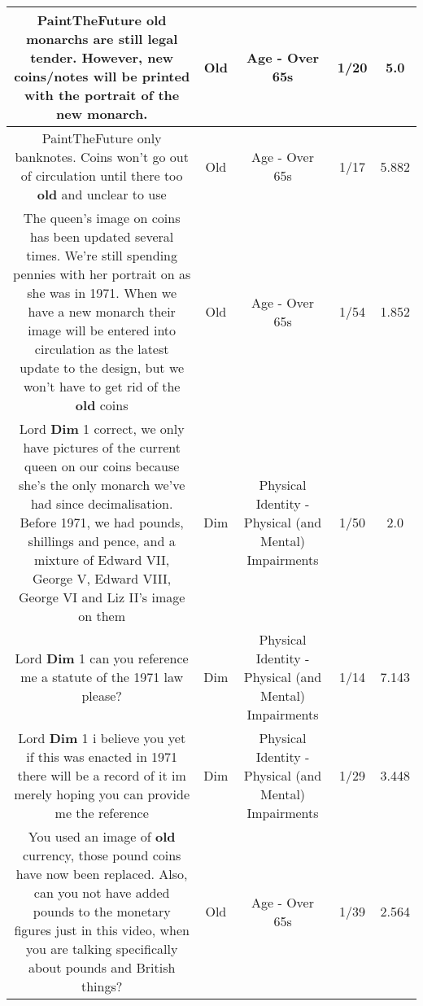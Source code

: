 \documentclass[11pt]{article}
\newlength\mylength
\begin{document}
\begin{center}
\begin{longtable}{|C{.65\mylength}|C{.30\mylength}|C{.12\mylength}|C{.12\mylength}|C{.12\mylength}|}
  \small PaintTheFuture \textbf{old} monarchs are still legal tender. However, new coins/notes will be printed with the portrait of the new monarch.\normalsize   & Old & Age - Over 65s & 1/20 & 5.0 \\  \hline
  \small PaintTheFuture only banknotes. Coins won't go out of circulation until there too \textbf{old} and unclear to use\normalsize   & Old & Age - Over 65s & 1/17 & 5.882 \\  \hline
  \small The queen's image on coins has been updated several times. We're still spending pennies with her portrait on as she was in 1971. When we have a new monarch their image will be entered into circulation as the latest update to the design, but we won't have to get rid of the \textbf{old} coins\normalsize   & Old & Age - Over 65s & 1/54 & 1.852 \\  \hline
  \small Lord \textbf{Dim} 1 correct, we only have pictures of the current queen on our coins because she's the only monarch we've had since decimalisation. Before 1971, we had pounds, shillings and pence, and a mixture of Edward VII, George V, Edward VIII, George VI and Liz II's image on them\normalsize   & Dim & Physical Identity - Physical (and Mental) Impairments & 1/50 & 2.0 \\  \hline
  \small Lord \textbf{Dim} 1 can you reference me a statute of the 1971 law please?\normalsize   & Dim & Physical Identity - Physical (and Mental) Impairments & 1/14 & 7.143 \\  \hline
  \small Lord \textbf{Dim} 1 i believe you yet if this was enacted in 1971 there will be a record of it im merely hoping you can provide me the reference\normalsize   & Dim & Physical Identity - Physical (and Mental) Impairments & 1/29 & 3.448 \\  \hline
  \small You used an image of \textbf{old} currency, those pound coins have now been replaced. Also, can you not have added pounds to the monetary figures just in this video, when you are talking specifically about pounds and British things?\normalsize   & Old & Age - Over 65s & 1/39 & 2.564 \\  \hline

\end{longtable}
\end{center}
\end{document}

